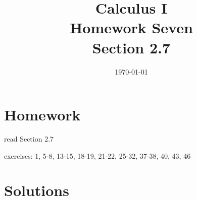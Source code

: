 \documentclass[letterpaper, landscape]{exam}
\title{Calculus I \\ Homework Seven \\ Section 2.7}
\author{}
\date{\today}
\begin{document}
  \maketitle

  \section{Homework}
    \begin{itemize*}
      \item read Section 2.7
      \item exercises: 1, 5-8, 13-15, 18-19, 21-22, 25-32, 37-38, 40, 43, 46
    \end{itemize*}

  \ifprintanswers

  \section{Solutions}
\end{document}
